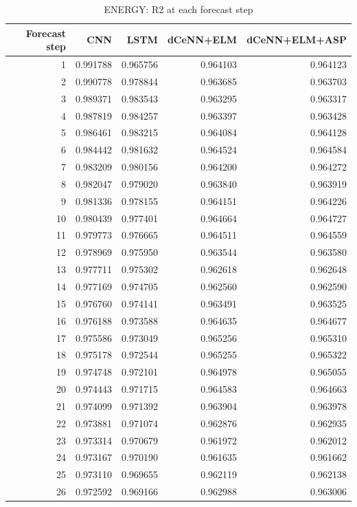 \begin{table}
\caption{ENERGY: R2 at each forecast step}
\begin{tabular}{rrrrr}
\toprule
Forecast step & CNN & LSTM & dCeNN+ELM & dCeNN+ELM+ASP \\
\midrule
1 & 0.991788 & 0.965756 & 0.964103 & 0.964123 \\
2 & 0.990778 & 0.978844 & 0.963685 & 0.963703 \\
3 & 0.989371 & 0.983543 & 0.963295 & 0.963317 \\
4 & 0.987819 & 0.984257 & 0.963397 & 0.963428 \\
5 & 0.986461 & 0.983215 & 0.964084 & 0.964128 \\
6 & 0.984442 & 0.981632 & 0.964524 & 0.964584 \\
7 & 0.983209 & 0.980156 & 0.964200 & 0.964272 \\
8 & 0.982047 & 0.979020 & 0.963840 & 0.963919 \\
9 & 0.981336 & 0.978155 & 0.964151 & 0.964226 \\
10 & 0.980439 & 0.977401 & 0.964664 & 0.964727 \\
11 & 0.979773 & 0.976665 & 0.964511 & 0.964559 \\
12 & 0.978969 & 0.975950 & 0.963544 & 0.963580 \\
13 & 0.977711 & 0.975302 & 0.962618 & 0.962648 \\
14 & 0.977169 & 0.974705 & 0.962560 & 0.962590 \\
15 & 0.976760 & 0.974141 & 0.963491 & 0.963525 \\
16 & 0.976188 & 0.973588 & 0.964635 & 0.964677 \\
17 & 0.975586 & 0.973049 & 0.965256 & 0.965310 \\
18 & 0.975178 & 0.972544 & 0.965255 & 0.965322 \\
19 & 0.974748 & 0.972101 & 0.964978 & 0.965055 \\
20 & 0.974443 & 0.971715 & 0.964583 & 0.964663 \\
21 & 0.974099 & 0.971392 & 0.963904 & 0.963978 \\
22 & 0.973881 & 0.971074 & 0.962876 & 0.962935 \\
23 & 0.973314 & 0.970679 & 0.961972 & 0.962012 \\
24 & 0.973167 & 0.970190 & 0.961635 & 0.961662 \\
25 & 0.973110 & 0.969655 & 0.962119 & 0.962138 \\
26 & 0.972592 & 0.969166 & 0.962988 & 0.963006 \\

\end{tabular}
\end{table}
